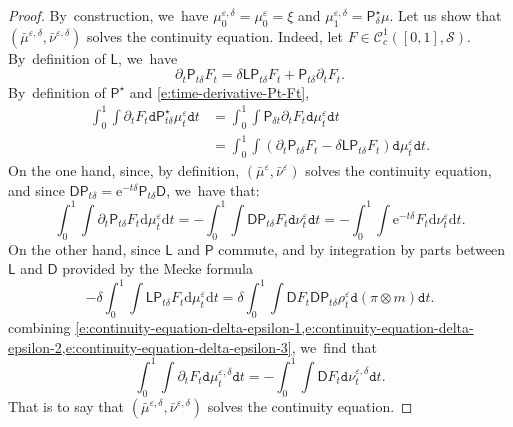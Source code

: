 \documentclass[10pt]{amsart}
\theoremstyle{definition}
\theoremstyle{remark}
\begin{document}
\begin{proof}
By~construction, we~have $\mu^{\varepsilon,\delta}_{0} = \mu^{\varepsilon}_{0} = \xi$ and $\mu^{\varepsilon,\delta}_{1} = \mathsf{P}^{\star}_{\delta} \mu$.
Let us show that $(\bar{\mu}^{\varepsilon,\delta}, \bar{\nu}^{\varepsilon,\delta})$ solves the continuity equation.
Indeed, let $F \in \mathscr{C}_{c}^{1}([0,1], \mathscr{S})$.
By~definition of $\mathsf{L}$, we~have
\begin{equation}\label{e:time-derivative-Pt-Ft}
\partial_{t} \mathsf{P}_{t \delta} F_{t} = \delta \mathsf{L} \mathsf{P}_{t \delta} F_{t} + \mathsf{P}_{t \delta} \partial_{t} F_{t}.
\end{equation}
By~definition of $\mathsf{P}^{\star}$ and \cref{e:time-derivative-Pt-Ft},
\begin{equation}\label{e:continuity-equation-delta-epsilon-1}
\begin{split}
\int_{0}^{1} \int \partial_{t} F_{t} \mathtt{d} \mathsf{P}^{\star}_{t\delta} \mu^{\varepsilon}_{t} \mathtt{d} t &= \int_{0}^{1} \int \mathsf{P}_{\delta t} \partial_{t} F_{t} \mathtt{d} \mu_{t}^{\varepsilon} \mathtt{d} t
\\&= \int_{0}^{1} \int (\partial_{t} \mathsf{P}_{t\delta}F_{t} - \delta \mathsf{L} \mathsf{P}_{t\delta}F_{t}) \mathtt{d} \mu^{\varepsilon}_{t} \mathtt{d} t.
\end{split}
\end{equation}
On the one hand, since, by definition, $(\bar{\mu}^{\varepsilon}, \bar{\nu}^{\varepsilon})$ solves the continuity equation, and since $\mathsf{D} \mathsf{P}_{t \delta} = \mathrm{e}^{-t \delta} \mathsf{P}_{t \delta} \mathsf{D}$, we~have that:
\begin{equation}\label{e:continuity-equation-delta-epsilon-2}
\int_{0}^{1} \int \partial_{t} \mathsf{P}_{t\delta}F_{t} \mathrm{d} \mu_{t}^{\varepsilon} \mathrm{d} t = - \int_{0}^{1} \int \mathsf{D} \mathsf{P}_{t \delta} F_{t} \mathtt{d} \nu^{\varepsilon}_{t} \mathtt{d} t = - \int_{0}^{1} \int \mathrm{e}^{-t\delta}F_{t} \mathrm{d} \nu^{\varepsilon}_{t} \mathrm{d} t.
\end{equation}
On the other hand, since $\mathsf{L}$ and $\mathsf{P}$ commute, and by integration by parts between $\mathsf{L}$ and $\mathsf{D}$ provided by the Mecke formula
\begin{equation}\label{e:continuity-equation-delta-epsilon-3}
- \delta \int_{0}^{1} \int \mathsf{L} \mathsf{P}_{t\delta} F_{t} \mathrm{d} \mu_{t}^{\varepsilon} \mathrm{d} t = \delta \int_{0}^{1} \int \mathsf{D} F_{t} \mathsf{D} \mathsf{P}_{t \delta} \rho^{\varepsilon}_{t} \mathtt{d} (\pi \otimes m) \mathtt{d} t.
\end{equation}
combining \cref{e:continuity-equation-delta-epsilon-1,e:continuity-equation-delta-epsilon-2,e:continuity-equation-delta-epsilon-3}, we~find that
\begin{equation*}
\int_{0}^{1} \int \partial_{t} F_{t} \mathtt{d} \mu^{\varepsilon,\delta}_{t} \mathtt{d} t = - \int_{0}^{1} \int \mathsf{D} F_{t} \mathtt{d} \nu^{\varepsilon, \delta}_{t} \mathtt{d} t.
\end{equation*}
That is to say that $(\bar{\mu}^{\varepsilon,\delta}, \bar{\nu}^{\varepsilon,\delta})$ solves the continuity equation.

\end{proof}
\end{document}

